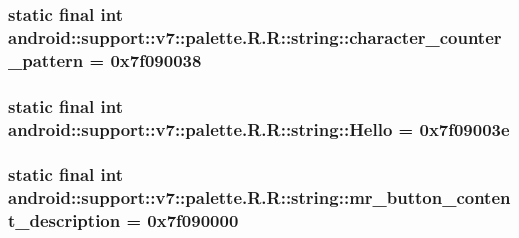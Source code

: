 \hypertarget{classandroid_1_1support_1_1v7_1_1palette_1_1_r_1_1string_65bf00afdbbf54c672d9256243507155}{
\subsubsection[{character\_\-counter\_\-pattern}]{\setlength{\rightskip}{0pt plus 5cm}static final int android::support::v7::palette.R.R::string::character\_\-counter\_\-pattern = 0x7f090038}}
\label{classandroid_1_1support_1_1v7_1_1palette_1_1_r_1_1string_65bf00afdbbf54c672d9256243507155}


\hypertarget{classandroid_1_1support_1_1v7_1_1palette_1_1_r_1_1string_89e6d5f385241204bbfbf306a1fe2333}{
\subsubsection[{Hello}]{\setlength{\rightskip}{0pt plus 5cm}static final int android::support::v7::palette.R.R::string::Hello = 0x7f09003e}}
\label{classandroid_1_1support_1_1v7_1_1palette_1_1_r_1_1string_89e6d5f385241204bbfbf306a1fe2333}


\hypertarget{classandroid_1_1support_1_1v7_1_1palette_1_1_r_1_1string_69e43a1bb0cd3f29b8757fb964694b26}{
\subsubsection[{mr\_\-button\_\-content\_\-description}]{\setlength{\rightskip}{0pt plus 5cm}static final int android::support::v7::palette.R.R::string::mr\_\-button\_\-content\_\-description = 0x7f090000}}
\label{classandroid_1_1support_1_1v7_1_1palette_1_1_r_1_1string_69e43a1bb0cd3f29b8757fb964694b26}



